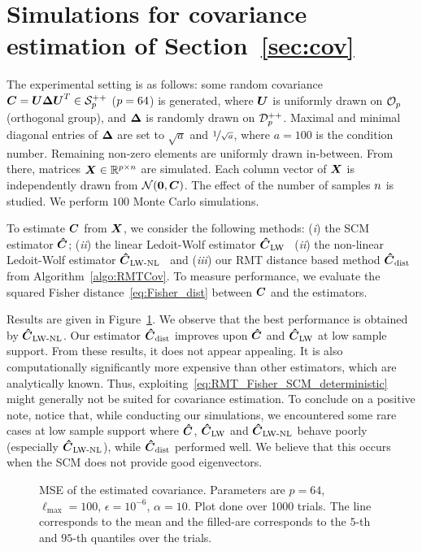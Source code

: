 \section{Simulations for covariance estimation of Section~\ref{sec:cov}}
\label{app:simu_RMTCov}
The experimental setting is as follows: some random covariance $\boldsymbol{C}=\boldsymbol{U}\boldsymbol{\Delta}\boldsymbol{U}^T\in\mathcal{S}^{++}_{p}$ ($p=64$) is generated, where $\boldsymbol{U}$ is uniformly drawn on $\mathcal{O}_{p}$ (orthogonal group), and $\boldsymbol{\Delta}$ is randomly drawn on $\mathcal{D}^{++}_{p}$.
Maximal and minimal diagonal entries of $\boldsymbol{\Delta}$ are set to $\sqrt{a}$ and $\nicefrac{1}{\sqrt{a}}$, where $a=100$ is the condition number.
Remaining non-zero elements are uniformly drawn in-between.
%
From there, matrices $\boldsymbol{X}\in\mathbb{R}^{p\times n}$ are simulated.
Each column vector of $\boldsymbol{X}$ is independently drawn from $\mathcal{N}(\boldsymbol{0},\boldsymbol{C})$.
The effect of the number of samples $n$ is studied.
We perform $100$ Monte Carlo simulations.

To estimate $\boldsymbol{C}$ from $\boldsymbol{X}$, we consider the following methods:
(\emph{i}) the SCM estimator $\boldsymbol{\hat{C}}$;
(\emph{ii}) the linear Ledoit-Wolf estimator $\boldsymbol{\hat{C}}_{\textup{LW}}$~\cite{ledoit2004well}
(\emph{ii}) the non-linear Ledoit-Wolf estimator $\boldsymbol{\hat{C}}_{\textup{LW-NL}}$~\cite{ledoit2020analytical}
and (\emph{iii}) our RMT distance based method $\boldsymbol{\hat{C}}_{\textup{dist}}$ from Algorithm~\ref{algo:RMTCov}.
%
To measure performance, we evaluate the squared Fisher distance~\eqref{eq:Fisher_dist} between $\boldsymbol{C}$ and the estimators.

Results are given in Figure~\ref{fig:cov_simu}.
We observe that the best performance is obtained by $\boldsymbol{\hat{C}}_{\textup{LW-NL}}$.
Our estimator $\boldsymbol{\hat{C}}_{\textup{dist}}$ improves upon $\boldsymbol{\hat{C}}$ and $\boldsymbol{\hat{C}}_{\textup{LW}}$ at low sample support.
From these results, it does not appear appealing.
It is also computationally significantly more expensive than other estimators, which are analytically known.
%
Thus, exploiting~\eqref{eq:RMT_Fisher_SCM_deterministic} might generally not be suited for covariance estimation.
%
To conclude on a positive note, notice that, while conducting our simulations, we encountered some rare cases at low sample support where $\boldsymbol{\hat{C}}$, $\boldsymbol{\hat{C}}_{\textup{LW}}$ and $\boldsymbol{\hat{C}}_{\textup{LW-NL}}$ behave poorly (especially $\boldsymbol{\hat{C}}_{\textup{LW-NL}}$), while $\boldsymbol{\hat{C}}_{\textup{dist}}$ performed well.
We believe that this occurs when the SCM does not provide good eigenvectors.

\begin{figure}[t]
    \centering
    
    \vspace{-2em}
    \caption{MSE of the estimated covariance. Parameters are $p=64$, $\ell_{\mathrm{max}}=100$, $\epsilon=10^{-6}$, $\alpha=10$. Plot done over 1000 trials. The line corresponds to the mean and the filled-are corresponds to the $5$-th and $95$-th quantiles over the trials.}
    \label{fig:cov_simu}
\end{figure}


